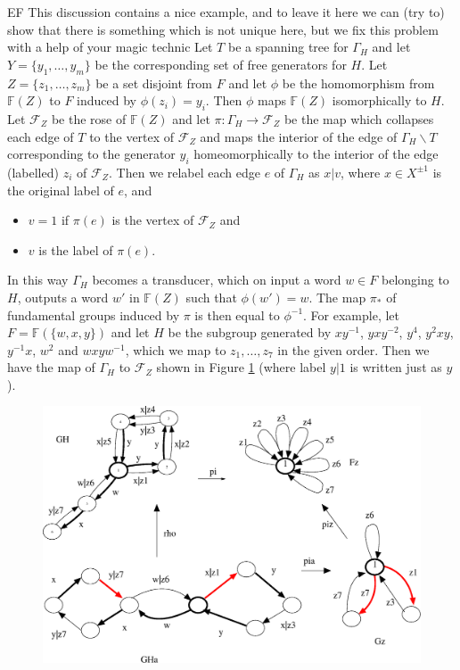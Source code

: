 \documentclass[a4paper,12pt]{article}
\newcommand{\G}{\Gamma }
\newcommand{\cF}{{\cal{F}}}
\numberwithin{equation}{section}
\numberwithin{figure}{section}
\newcommand{\FF}{\ensuremath{\mathbb{F}}}
\renewcommand{\cF}{\mathcal{F}}
\newcommand{\maps}{\rightarrow}
\newcommand{\bs}{\backslash}
\newenvironment{bl}{\noindent\color{blue} EF }{}
\newcommand{\li}[1]{\begin{bl} #1 \end{bl}}
\begin{document}
\li{This discussion contains a nice example, and to leave it here we can (try to) show that there is something which is not unique here, but we fix this problem with a help of your magic technic}
 Let $T$ be a spanning tree for $\G_H$ and let    $Y=\{y_1,\ldots, y_m\}$  be 
the corresponding set of  free generators for $H$. Let $Z=\{z_1,\ldots, z_m\}$ be
 a set disjoint from $F$ and let $\phi$ be the homomorphism from $\FF(Z)$ to $F$ induced by
$\phi(z_i)=y_i$. Then $\phi$ maps $\FF(Z)$ isomorphically to $H$. Let $\cF_Z$ be the rose of $\FF(Z)$ 
and let $\pi:\G_H \maps \cF_Z$ be the map which collapses each edge of $T$ to the vertex 
of $\cF_Z$ and maps  the interior of the edge of $\G_H\bs T$ corresponding to the generator $y_i$ homeomorphically to the interior of the   edge
(labelled) $z_i$ of $\cF_Z$. Then we relabel each edge $e$  of $\G_H$ as 
$x|v$, where $x\in X^{\pm 1}$ is the
original label of $e$, and 
\begin{itemize}
\item $v=1$ if $\pi(e)$ is the vertex of $\cF_Z$ and 
\item 
$v$ is the 
label of $\pi(e)$.  
\end{itemize}
In this way $\G_H$ becomes a transducer, which on
input a word $w\in F$ belonging to $H$, outputs a word $w'$ in $\FF(Z)$ such that $\phi(w')=w$. 
 The map $\pi_*$ of fundamental groups induced by $\pi$ is then equal to $\phi^{-1}$. 
For example, let $F=\FF(\{w,x,y\})$ and let $H$ be the subgroup
 generated by $xy^{-1}$, $yxy^{-2}$, $y^4$, $y^2xy$, $y^{-1}x$, 
$w^2$ and $wxyw^{-1}$, which we map to $z_1,\ldots ,z_7$ in the given order. 
Then we have the map of $\G_H$ to $\cF_Z$ shown in Figure \ref{fig:h} 
(where label $y|1$ is written just as $y$).
\begin{figure}
\begin{center}
\psfrag{GH}{$\G_H$}
\psfrag{Gz}{$\G_a^Z$}
\psfrag{GHa}{$\G_{H_a}$}
\psfrag{Fz}{$\cF_Z$}
\includegraphics[scale=.5]{../python/genfold/hs.eps}
\end{center}
\caption{}\label{fig:h}
\end{figure}
\end{document}

